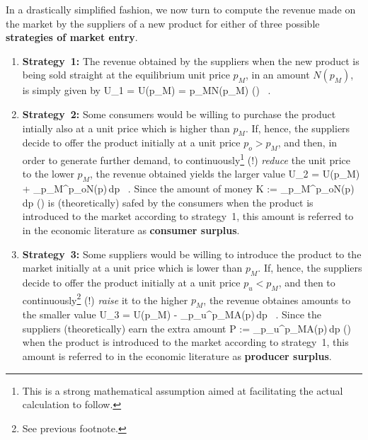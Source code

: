 \medskip
\noindent
In a drastically simplified fashion, we now turn to compute the 
revenue made on the market by the suppliers of a new product for 
either of three possible {\bf strategies of market entry}.
%
\begin{enumerate}

\item {\bf Strategy~1:} The revenue obtained by the suppliers when 
the new product is being sold straight at the equilibrium unit 
price $p_{M}$, in an amount $N(p_{M})$, is simply given by
%
\be
U_{1} = U(p_{M}) = p_{M}N(p_{M}) \qquad
() \ .
\ee
%

\item {\bf Strategy~2:} Some consumers would be willing to 
purchase the product intially also at a unit price which is higher 
than $p_{M}$. If, hence, the suppliers decide to offer the product 
initially at a unit price $p_{o} > p_{M}$, and then, in order to 
generate further demand, to continuously\footnote{This is a strong 
mathematical assumption aimed at facilitating the actual 
calculation to follow.} (!) \emph{reduce} the unit price to the 
lower $p_{M}$, the revenue obtained yields the larger value
%
\be
U_{2} = U(p_{M}) + \int_{p_{M}}^{p_{o}}N(p)\,{\rm d}p \ .
\ee
%
Since the amount of money
%
\be
K := \int_{p_{M}}^{p_{o}}N(p)\,{\rm d}p \qquad
()
\ee
%
is (theoretically) safed by the consumers when the product is 
introduced to the market according to strategy~1, this amount is 
referred to in the economic literature as {\bf consumer surplus}.

\item {\bf Strategy~3:} Some suppliers would be willing to 
introduce the product to the market initially at a unit price 
which is lower than $p_{M}$. If, hence, the suppliers decide to 
offer the product initially at a unit price $p_{u} < p_{M}$, and 
then to continuously\footnote{See previous footnote.} (!) 
\emph{raise} it to the higher $p_{M}$, the revenue obtaines 
amounts to the smaller value
%
\be
U_{3} = U(p_{M}) - \int_{p_{u}}^{p_{M}}A(p)\,{\rm d}p \ .
\ee
%
Since the suppliers (theoretically) earn the extra amount
%
\be
P := \int_{p_{u}}^{p_{M}}A(p)\,{\rm d}p \qquad
()
\ee
%
when the product is introduced to the market according to 
strategy~1, this amount is referred to in the economic literature 
as {\bf producer surplus}.

\end{enumerate}
%

